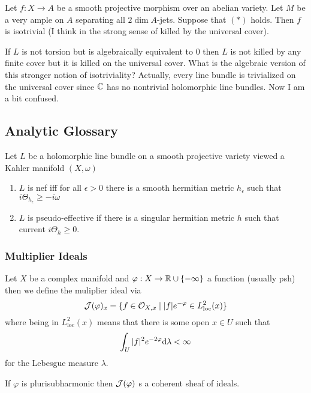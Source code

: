 \documentclass[12pt]{article}
\begin{document}
\begin{theorem}
Let $f : X \to A$ be a smooth projective morphism over an abelian variety. Let $M$ be a very ample on $A$ separating all $2 \dim{A}$-jets. Suppose that $(\ast)$ holds. Then $f$ is isotrivial (I think in the strong sense of killed by the universal cover). 
\end{theorem}

\begin{rmk}
If $L$ is not torsion but is algebraically equivalent to $0$ then $L$ is not killed by any finite \etale cover but it is killed on the universal cover. What is the algebraic version of this stronger notion of isotriviality? Actually, every line bundle is trivialized on the universal cover since $\mathbb{C}$ has no nontrivial holomorphic line bundles. Now I am a bit confused. 
\end{rmk}

\subsection{Analytic Glossary}

Let $L$ be a holomorphic line bundle on a smooth projective variety viewed a Kahler manifold $(X, \omega)$
\begin{enumerate}
\item $L$ is nef iff for all $\epsilon > 0$ there is a smooth hermitian metric $h_\epsilon$ such that $i \Theta_{h_\epsilon} \ge - i \omega$
\item $L$ is pseudo-effective if there is a singular hermitian metric $h$ such that current $i \Theta_h \ge 0$.
\end{enumerate}

\subsubsection{Multiplier Ideals}


Let $X$ be a complex manifold and $\varphi : X \to \mathbb{R} \cup \{ - \infty \}$ a function (usually psh) then we define the muliplier ideal via
\[ \mathcal{J}(\varphi)_x = \{ f \in \mathcal{O}_{X, x} \mid |f| e^{-\varphi} \in L^2_{\text{loc}}(x) \} \]
where being in $L^2_{\text{loc}}(x)$ means that there is some open $x \in U$ such that
\[ \int_U |f|^2 e^{-2 \varphi} \mathrm{d}{\lambda} < \infty \]
for the Lebesgue measure $\lambda$.

\begin{theorem}[Nadel]
If $\varphi$ is plurisubharmonic then $\mathcal{J}(\varphi)$ s a coherent sheaf of ideals.
\end{theorem}
\end{document}
